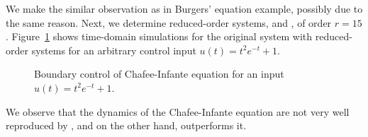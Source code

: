 We make the similar observation as in Burgers' equation example, possibly due to the same reason. Next, we determine  reduced-order systems, {\redQBbal} and {\redBbal}, of order $r = 15$. Figure~\ref{fig:time_domain_CI} shows time-domain simulations for the original system with reduced-order systems for an arbitrary control input $u(t) = t^2e^{-t}+1$.
\begin{figure}[h]
        \centering
 \begin{subfigure}[t]{0.48\textwidth}
  \centering
		\setlength\fheight{3cm}
	\setlength\fwidth{5.5cm}
	
 \end{subfigure}
 \begin{subfigure}[t]{0.48\textwidth}
  \centering
	\setlength\fheight{3cm}
	\setlength\fwidth{5.5cm}
	
 \end{subfigure}
 \caption{Boundary control of Chafee-Infante equation for an input $u(t) = t^2e^{-t}+1$.}
\label{fig:time_domain_CI}
\end{figure}

We observe that the dynamics of the Chafee-Infante equation are not very well reproduced by {\redBbal}, and on the other hand, {\redQBbal} outperforms it.

